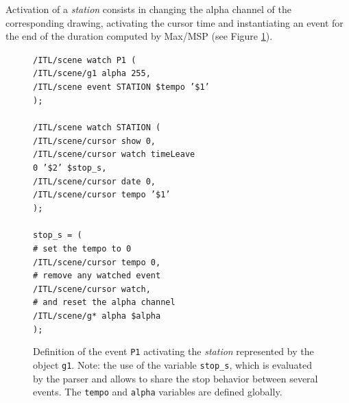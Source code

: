 \documentclass{article}
\newcommand{\OSC}[1]	{{\fontsize{8.5pt}{8pt} \selectfont\texttt{#1}}}
\newcommand{\tab}{\hspace*{4mm}}
\newcommand{\sample}[1]		{\vspace{-0.2em}\begin{center}\colorbox{mygrey}{\begin{minipage}[t]{0.98\columnwidth} {\small \texttt{#1}}\end{minipage}}\end{center}}
\begin{document}
Activation of a \emph{station} consists in changing the alpha channel of the corresponding drawing, activating the cursor time and instantiating an event for the end of the duration computed by Max/MSP (see Figure \ref{fig:station}).
\begin{figure}[h]
   \centering
\sample{/ITL/scene watch P1 ( \\
\tab/ITL/scene/g1 alpha 255, \\
\tab/ITL/scene event STATION \$tempo '\$1' \\
); \\
\\
/ITL/scene watch STATION ( \\
\tab/ITL/scene/cursor show 0,\\
\tab/ITL/scene/cursor watch timeLeave \\
\hspace*{30mm}0 '\$2' \$stop\_s,\\
\tab/ITL/scene/cursor date 0,\\
\tab/ITL/scene/cursor tempo '\$1'\\
); \\
\\
stop\_s = ( \\
\tab\# set the tempo to 0 \\
\tab/ITL/scene/cursor tempo 0, \\
\tab\# remove any watched event \\
\tab/ITL/scene/cursor watch,  \\
\tab\# and reset the alpha channel \\
\tab/ITL/scene/g* alpha \$alpha \\
);
}
   \caption{Definition of the event \OSC{P1} activating the \emph{station} represented by the object \OSC{g1}. Note: the use of the variable \OSC{stop\_s}, which is evaluated by the parser and allows to share the stop behavior between several events. The \OSC{tempo} and \OSC{alpha} variables are defined globally.}
   \label{fig:station}
\end{figure}
\end{document}
